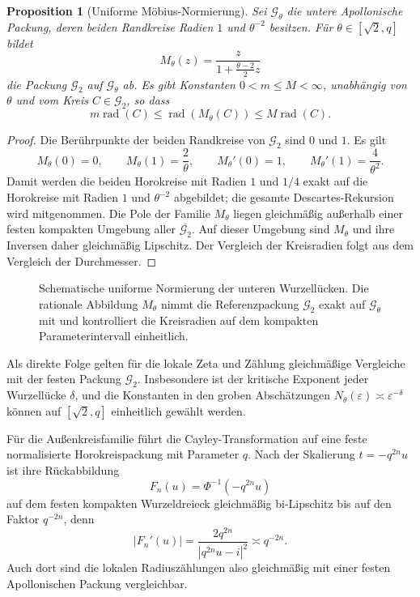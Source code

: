 \documentclass[11pt,a4paper]{article}
\newtheorem{proposition}[remark]{Proposition}
\begin{document}
\begin{proposition}[Uniforme Möbius-Normierung]
Sei $\mathcal G_\theta$ die untere Apollonische Packung, deren beiden
Randkreise Radien $1$ und $\theta^{-2}$ besitzen. Für
$\theta\in[\sqrt2,q]$ bildet
\[
 M_\theta(z)=\frac{z}{1+\frac{\theta-2}{2}z}
\]
die Packung $\mathcal G_2$ auf $\mathcal G_\theta$ ab. Es gibt Konstanten
$0<m\le M<\infty$, unabhängig von $\theta$ und vom Kreis $C\in\mathcal G_2$,
so dass
\[
 m\operatorname{rad}(C)
 \le\operatorname{rad}(M_\theta(C))
 \le M\operatorname{rad}(C).
\]
\end{proposition}

\begin{proof}
Die Berührpunkte der beiden Randkreise von $\mathcal G_2$ sind $0$ und $1$.
Es gilt
\[
 M_\theta(0)=0,
 \qquad M_\theta(1)=\frac2\theta,
 \qquad M_\theta'(0)=1,
 \qquad M_\theta'(1)=\frac4{\theta^2}.
\]
Damit werden die beiden Horokreise mit Radien $1$ und $1/4$ exakt auf die
Horokreise mit Radien $1$ und $\theta^{-2}$ abgebildet; die gesamte
Descartes-Rekursion wird mitgenommen. Die Pole der Familie $M_\theta$ liegen
gleichmäßig außerhalb einer festen kompakten Umgebung aller
$\overline{\mathcal G_2}$. Auf dieser Umgebung sind $M_\theta$ und ihre
Inversen daher gleichmäßig Lipschitz. Der Vergleich der Kreisradien folgt
aus dem Vergleich der Durchmesser.
\end{proof}

\begin{figure}[htbp]
 \centering
 
 \caption{Schematische uniforme Normierung der unteren Wurzellücken.
 Die rationale Abbildung $M_\theta$ nimmt die Referenzpackung
 $\mathcal G_2$ exakt auf $\mathcal G_\theta$ mit und kontrolliert die
 Kreisradien auf dem kompakten Parameterintervall einheitlich.}
 \label{fig:moebius-normalization}
\end{figure}

Als direkte Folge gelten für die lokale Zeta und Zählung gleichmäßige
Vergleiche mit der festen Packung $\mathcal G_2$. Insbesondere ist der
kritische Exponent jeder Wurzellücke $\delta$, und die Konstanten in den
groben Abschätzungen $N_\theta(\varepsilon)\asymp
\varepsilon^{-\delta}$ können auf $[\sqrt2,q]$ einheitlich gewählt werden.

Für die Außenkreisfamilie führt die Cayley-Transformation auf eine feste
normalisierte Horokreispackung mit Parameter $q$. Nach der Skalierung
$t=-q^{2n}u$ ist ihre Rückabbildung
\[
 F_n(u)=\Phi^{-1}(-q^{2n}u)
\]
auf dem festen kompakten Wurzeldreieck gleichmäßig bi-Lipschitz bis auf den
Faktor $q^{-2n}$, denn
\[
 |F_n'(u)|=\frac{2q^{2n}}{|q^{2n}u-i|^2}\asymp q^{-2n}.
\]
Auch dort sind die lokalen Radiuszählungen also gleichmäßig mit einer festen
Apollonischen Packung vergleichbar.
\end{document}
